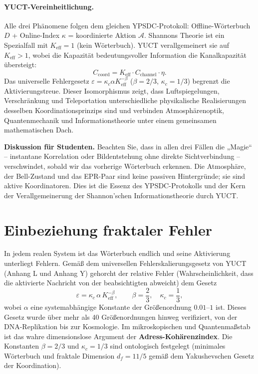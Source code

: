 \documentclass[12pt,a4paper]{article}
\theoremstyle{remark}
\begin{document}
	\paragraph{YUCT-Vereinheitlichung.}
	Alle drei Phänomene folgen dem gleichen YPSDC-Protokoll: Offline-Wörterbuch $D$ + Online-Index $\kappa$ = koordinierte Aktion $\mathcal{A}$. Shannons Theorie ist ein Spezialfall mit $K_{\mathrm{eff}}=1$ (kein Wörterbuch). YUCT verallgemeinert sie auf $K_{\mathrm{eff}}>1$, wobei die Kapazität bedeutungsvoller Information die Kanalkapazität übersteigt:
	\[
	C_{\mathrm{coord}} = K_{\mathrm{eff}} \cdot C_{\mathrm{channel}} \cdot \eta.
	\]
	Das universelle Fehlergesetz $\varepsilon = \kappa_c \alpha K_{\mathrm{eff}}^{-\beta}$ ($\beta=2/3$, $\kappa_c=1/3$) begrenzt die Aktivierungstreue. Dieser Isomorphismus zeigt, dass Luftspiegelungen, Verschränkung und Teleportation unterschiedliche physikalische Realisierungen desselben Koordinationsprinzips sind und verbinden Atmosphärenoptik, Quantenmechanik und Informationstheorie unter einem gemeinsamen mathematischen Dach.
	
	\vspace{0.2cm}
	\noindent\textbf{Diskussion für Studenten.} 
	Beachten Sie, dass in allen drei Fällen die „Magie“ – instantane Korrelation oder Bildentstehung ohne direkte Sichtverbindung – verschwindet, sobald wir das vorherige Wörterbuch erkennen. Die Atmosphäre, der Bell-Zustand und das EPR-Paar sind keine passiven Hintergründe; sie sind aktive Koordinatoren. Dies ist die Essenz des YPSDC-Protokolls und der Kern der Verallgemeinerung der Shannon'schen Informationstheorie durch YUCT.
	
	\section{Einbeziehung fraktaler Fehler}
	\label{sec:errors}
	
	In jedem realen System ist das Wörterbuch endlich und seine Aktivierung unterliegt Fehlern. Gemäß dem universellen Fehlerskalierungsgesetz von YUCT (Anhang L und Anhang Y) gehorcht der relative Fehler (Wahrscheinlichkeit, dass die aktivierte Nachricht von der beabsichtigten abweicht) dem Gesetz
	\begin{equation}
		\boxed{\varepsilon = \kappa_c \, \alpha \, K_{\mathrm{eff}}^{-\beta}}, \qquad 
		\beta = \frac{2}{3},\quad \kappa_c = \frac{1}{3},
		\label{eq:error-law-corrected}
	\end{equation}
	wobei $\alpha$ eine systemabhängige Konstante der Größenordnung $0.01$–$1$ ist. Dieses Gesetz wurde über mehr als 40 Größenordnungen hinweg verifiziert, von der DNA-Replikation bis zur Kosmologie.  
	Im mikroskopischen und Quantenmaßstab ist das wahre dimensionslose Argument der \textbf{Adress-Kohärenzindex}. Die Konstanten $\beta = 2/3$ und $\kappa_c = 1/3$ sind ontologisch festgelegt (minimales Wörterbuch und fraktale Dimension $d_f = 11/5$ gemäß dem Yakushevschen Gesetz der Koordination).
	
\end{document}
